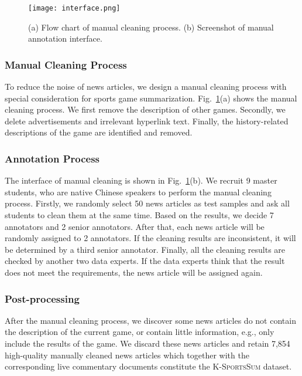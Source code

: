 \begin{figure}[t]
\centering
\setlength{\belowcaptionskip}{-10pt}
\centerline{\texttt{[image: interface.png]}}
\caption{(a) Flow chart of manual cleaning process. (b) Screenshot of manual annotation interface.}
\label{fig:human}
\end{figure}

\subsubsection{Manual Cleaning Process}
To reduce the noise of news articles, we design a manual cleaning process with special consideration for sports game summarization.
Fig.~\ref{fig:human}(a) shows the manual cleaning process. We first remove the description of other games. Secondly, we delete advertisements and irrelevant hyperlink text. Finally, the history-related descriptions of the game are identified and removed.

\subsubsection{Annotation Process}
The interface of manual cleaning is shown in Fig.~\ref{fig:human}(b).
We recruit 9 master students, who are native Chinese speakers to perform the manual cleaning process. Firstly, we randomly select 50 news articles as test samples and ask all students to clean them at the same time. Based on the results, we decide 7 annotators and 2 senior annotators. After that, each news article will be randomly assigned to 2 annotators. If the cleaning results are inconsistent, it will be determined by a third senior annotator. Finally, all the cleaning results are checked by another two data experts. If the data experts think that the result does not meet the requirements, the news article will be assigned again.

\subsubsection{Post-processing}
After the manual cleaning process, we discover some news articles do not contain the description of the current game, or contain little information, e.g., only include the results of the game.
We discard these news articles and retain 7,854 high-quality manually cleaned news articles which together with the corresponding live commentary documents constitute the \textsc{K-SportsSum} dataset. 

